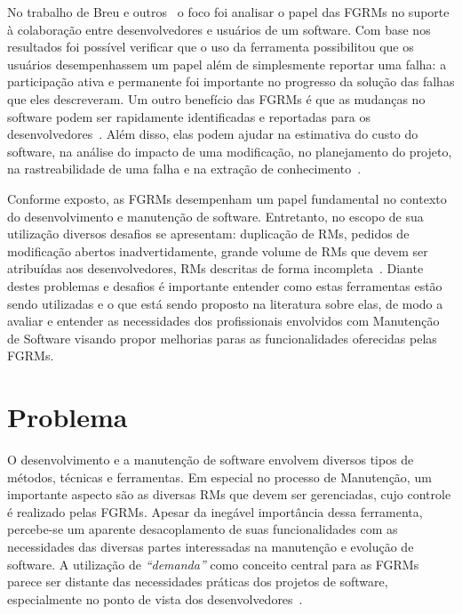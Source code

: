 No trabalho de Breu e outros~\cite{breu2010information} o foco foi
analisar o papel das FGRMs no suporte à colaboração entre desenvolvedores e
usuários de um software. Com base nos resultados foi possível verificar que o
uso da ferramenta possibilitou que os usuários desempenhassem um papel além de
simplesmente reportar uma falha: a participação ativa e permanente foi
importante no progresso da solução das falhas que eles descreveram. Um outro
benefício das FGRMs é que as mudanças no software podem ser rapidamente
identificadas e reportadas para os desenvolvedores~\cite{anvik2005coping}. Além
disso, elas podem ajudar na estimativa do custo do software, na análise do
impacto de uma modificação, no planejamento do projeto, na rastreabilidade de
uma falha e na extração de conhecimento~\cite{cavalcanti2013bug}.

Conforme exposto, as FGRMs desempenham um papel fundamental no contexto do
desenvolvimento e manutenção de software. Entretanto, no escopo de sua
utilização diversos desafios se apresentam: duplicação de RMs, pedidos de
modificação abertos inadvertidamente, grande volume de RMs que devem ser
atribuídas aos desenvolvedores, RMs descritas de forma
incompleta~\cite{cavalcanti2014challenges}. Diante destes problemas e desafios
é importante entender como estas ferramentas estão sendo utilizadas e o que
está sendo proposto na literatura sobre elas, de modo a avaliar e entender as
necessidades dos profissionais envolvidos com Manutenção de Software visando
propor melhorias paras as funcionalidades oferecidas pelas FGRMs.

\section{Problema}\label{sec:intro-problema}

O desenvolvimento e a manutenção de software envolvem diversos tipos de métodos,
técnicas e ferramentas. Em especial no processo de Manutenção, um importante
aspecto são as diversas RMs que devem ser gerenciadas, cujo controle é realizado
pelas FGRMs. Apesar da inegável importância dessa ferramenta, percebe-se um
aparente desacoplamento de suas funcionalidades com as necessidades das diversas
partes interessadas na manutenção e evolução de software. A utilização de
\textit{``demanda''} como conceito central para as FGRMs parece ser distante das
necessidades práticas dos projetos de software, especialmente no ponto de vista
dos desenvolvedores~\cite{Baysal:2013:SAP:2486788.2486957}.

